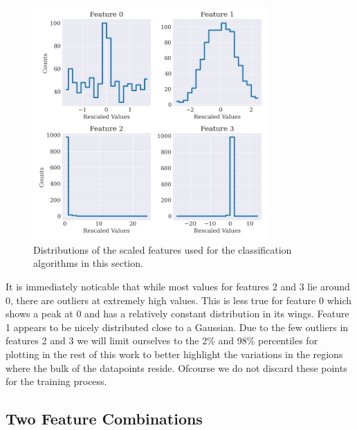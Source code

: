 \begin{figure}
    \centering
    \includegraphics[width=0.8\textwidth]{results/scaled_features_dist.png}
    \caption{Distributions of the scaled features used for the classification algorithms in this section.}
    \label{fig:feat_dist}
\end{figure}

It is immediately noticable that while most values for features 2 and 3 lie around 0, there are outliers at extremely high values. This is less true for feature 0 which shows a peak at 0 and has a relatively constant distribution in its wings. Feature 1 appears to be nicely distributed close to a Gaussian. Due to the few outliers in features 2 and 3 we will limit ourselves to the 2\% and 98\% percentiles for plotting in the rest of this work to better highlight the variations in the regions where the bulk of the datapoints reside. Ofcourse we do not discard these points for the training process.

\subsection{Two Feature Combinations}





